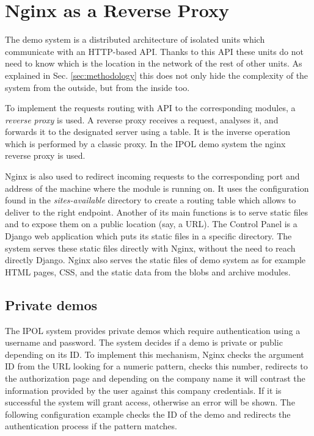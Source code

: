 
\section{Nginx as a Reverse Proxy}
\label{sec:reverse_proxy}

The demo system is a distributed architecture of isolated units which communicate with an HTTP-based API. Thanks to this API these
units do not need to know which is the location in the network of the rest of other units. As explained in Sec. \ref{sec:methodology} this
does not only hide the complexity of the system from the outside, but from the inside too.

To implement the requests routing with API to the corresponding modules, a \emph{reverse proxy} is used. A reverse proxy receives a
request, analyses it, and forwards it to the designated server using a table. It is the inverse operation which is performed by a
classic proxy. In the IPOL demo system the nginx reverse proxy is used.

Nginx is also used to redirect incoming requests to the corresponding port and address of the machine where the module is 
running on. It uses the configuration found in the \emph{sites-available} directory to create a routing table which allows to deliver to the right endpoint.
Another of its main functions is to serve static files and to expose them on a public location (say, a URL). The Control Panel is a Django web application which puts its static files in a specific directory. 
The system serves these static files directly with Nginx, without the need to reach directly Django. Nginx also serves the static files of demo system as for example HTML pages, CSS, and the static data from the blobs and archive modules.

\subsection{Private demos}
The IPOL system provides private demos which require authentication using a username and password. The system decides if a demo is private or public depending on its ID. To implement this mechanism, Nginx checks the argument ID from the URL looking for a numeric pattern, checks this number, redirects to the authorization page and depending on the company name it will contrast the information provided by the user against this company credentials. If it is successful the system will grant access, otherwise an error will be shown. The following configuration example checks the ID of the demo and redirects the authentication process if the pattern matches.

